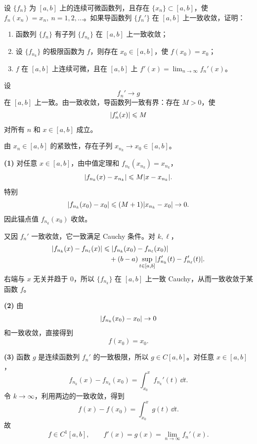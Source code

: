 \begin{xreferenceproblem}[5]
设 $\{f_n\}$ 为 $[a,b]$ 上的连续可微函数列，且存在 $\{x_n\}\subset[a,b]$，使 $f_n(x_n)=x_n,\ n=1,2,\ldots$。如果导函数列 $\{f_n'\}$ 在 $[a,b]$ 上一致收敛，证明：
  \begin{enumerate}[label=(\arabic*)]
    \item 函数列 $\{f_n\}$ 有子列 $\{f_{n_k}\}$ 在 $[a,b]$ 上一致收敛；
    \item 设 $\{f_{n_k}\}$ 的极限函数为 $f$，则存在 $x_0\in[a,b]$，使 $f(x_0)=x_0$；
    \item $f$ 在 $[a,b]$ 上连续可微，且在 $[a,b]$ 上 $f'(x)=\displaystyle\lim_{n\to\infty}f_n'(x)$。
  \end{enumerate}
\end{xreferenceproblem}
\begin{xsolution}
设
\[
  f_n'\to g
\]
在 $[a,b]$ 上一致。由一致收敛，导函数列一致有界：存在 $M>0$，使
\[
  \lvert f_n'(x)\rvert\leqslant M
\]
对所有 $n$ 和 $x\in[a,b]$ 成立。

由 $x_n\in[a,b]$ 的紧致性，存在子列 $x_{n_k}\to x_0\in[a,b]$。

\textbf{(1)} 对任意 $x\in[a,b]$，由中值定理和 $f_{n_k}(x_{n_k})=x_{n_k}$，
\[
  \lvert f_{n_k}(x)-x_{n_k}\rvert
  \leqslant M\lvert x-x_{n_k}\rvert.
\]
特别
\[
  \lvert f_{n_k}(x_0)-x_0\rvert
  \leqslant(M+1)\lvert x_{n_k}-x_0\rvert\to0.
\]
因此锚点值 $f_{n_k}(x_0)$ 收敛。

又因 $f_n'$ 一致收敛，它一致满足 Cauchy 条件。对 $k,\ell$，
\[
\begin{aligned}
  \lvert f_{n_k}(x)-f_{n_\ell}(x)\rvert
  &\leqslant\lvert f_{n_k}(x_0)-f_{n_\ell}(x_0)\rvert\\
  &\quad +(b-a)\sup_{t\in[a,b]}
    \lvert f_{n_k}'(t)-f_{n_\ell}'(t)\rvert.
\end{aligned}
\]
右端与 $x$ 无关并趋于 $0$，所以 $\{f_{n_k}\}$ 在 $[a,b]$ 上一致 Cauchy，从而一致收敛于某函数 $f$。

\textbf{(2)} 由
\[
  \lvert f_{n_k}(x_0)-x_0\rvert\to0
\]
和一致收敛，直接得到
\[
  \boxed{f(x_0)=x_0}.
\]

\textbf{(3)} 函数 $g$ 是连续函数列 $f_n'$ 的一致极限，所以 $g\in C[a,b]$。对任意 $x\in[a,b]$，
\[
  f_{n_k}(x)-f_{n_k}(x_0)
  =\int_{x_0}^{x}f_{n_k}'(t)\,\dd t.
\]
令 $k\to\infty$，利用两边的一致收敛，得到
\[
  f(x)-f(x_0)=\int_{x_0}^{x}g(t)\,\dd t.
\]
故
\[
  f\in C^1[a,b],
  \qquad
  f'(x)=g(x)=\lim_{n\to\infty}f_n'(x).
\]
\end{xsolution}


